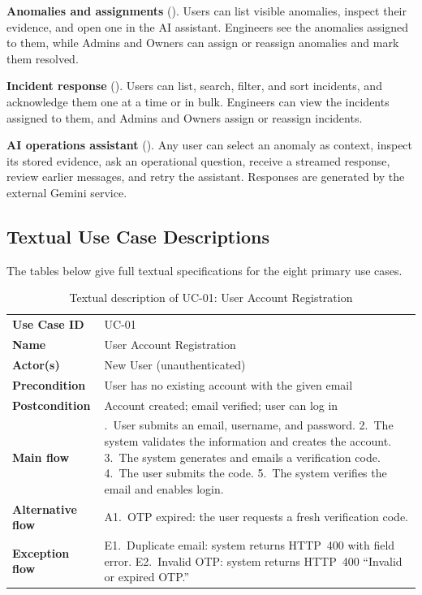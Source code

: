 \textbf{Anomalies and assignments} ().  Users can list visible
anomalies, inspect their evidence, and open one in the AI assistant.
Engineers see the anomalies assigned to them, while Admins and Owners can
assign or reassign anomalies and mark them resolved.


\textbf{Incident response} ().  Users can list, search, filter,
and sort incidents, and acknowledge them one at a time or in bulk.  Engineers
can view the incidents assigned to them, and Admins and Owners assign or
reassign incidents.


\textbf{AI operations assistant} ().  Any user can select an
anomaly as context, inspect its stored evidence, ask an operational question,
receive a streamed response, review earlier messages, and retry the
assistant.  Responses are generated by the external Gemini service.


\subsection{Textual Use Case Descriptions}

The tables below give full textual specifications for the eight primary use
cases.

\begin{longtable}{@{}>{\raggedright\arraybackslash}p{} >{\raggedright\arraybackslash}p{}@{}}
\caption{Textual description of UC-01: User Account Registration}\label{tab:uc01}\\
\toprule
\textbf{Use Case ID} & UC-01\\
\textbf{Name} & User Account Registration\\
\textbf{Actor(s)} & New User (unauthenticated)\\
\textbf{Precondition} & User has no existing account with the given email\\
\textbf{Postcondition} & Account created; email verified; user can log in\\
\textbf{Main flow} &
  1.~User submits an email, username, and password.
  2.~The system validates the information and creates the account.
  3.~The system generates and emails a verification code.
  4.~The user submits the code.
  5.~The system verifies the email and enables login.\\
\textbf{Alternative flow} &
  A1.~OTP expired: the user requests a fresh verification code.\\
\textbf{Exception flow} &
  E1.~Duplicate email: system returns HTTP~400 with field error.
  E2.~Invalid OTP: system returns HTTP~400 ``Invalid or expired OTP.''\\
\bottomrule
\end{longtable}

